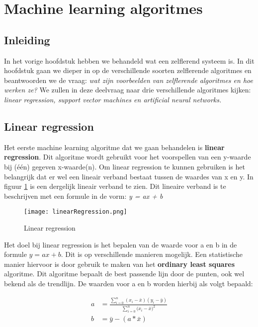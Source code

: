 \section{Machine learning algoritmes}
\label{chapter:MLA}

\subsection{Inleiding}
In het vorige hoofdstuk hebben we behandeld wat een zelflerend systeem is. In dit hoofdstuk gaan we dieper in op de verschillende soorten zelflerende algoritmes en beantwoorden we de vraag: \textit{wat zijn voorbeelden van zelflerende algoritmes en hoe werken ze?} We zullen in deze deelvraag naar drie verschillende algoritmes kijken: \textit{linear regression, support vector machines en artificial neural networks.} \cite{SunilRay} 

\subsection{Linear regression}
Het eerste machine learning algoritme dat we gaan behandelen is \textbf{linear regression}. Dit algoritme wordt gebruikt voor het voorspellen van een y-waarde bij (\'e\'en) gegeven x-waarde(n). Om linear regression te kunnen gebruiken is het belangrijk dat er wel een lineair verband bestaat tussen de waardes van x en y. In figuur \ref{fig:LinearRegression1} is een dergelijk lineair verband te zien. 
Dit lineaire verband is te beschrijven met een formule in de vorm: \textit{y = ax + b}

\begin{figure}[H]
  \centering
    \texttt{[image: linearRegression.png]}
  \caption{Linear regression}
  \label{fig:LinearRegression1}
\end{figure}

Het doel bij linear regression is het bepalen van de waarde voor a en b in de formule $ y = ax + b $. Dit is op verschillende manieren mogelijk. Een statistische manier hiervoor is door gebruik te maken van het \textbf{ordinary least squares} algoritme. Dit algoritme bepaalt de best passende lijn door de punten, ook wel bekend als de trendlijn. De waarden voor a en b worden hierbij als volgt bepaald:

\begin{align*}
	a&=\frac{\sum_{i=0}^{n}(x_{i}-\bar{x})(y_{i}-\bar{y})}{\sum_{i=0}^{n}{(x_{i}-\bar{x}})^{2}}\\
	b&=\bar{y}-(a * \bar{x})
\end{align*}

